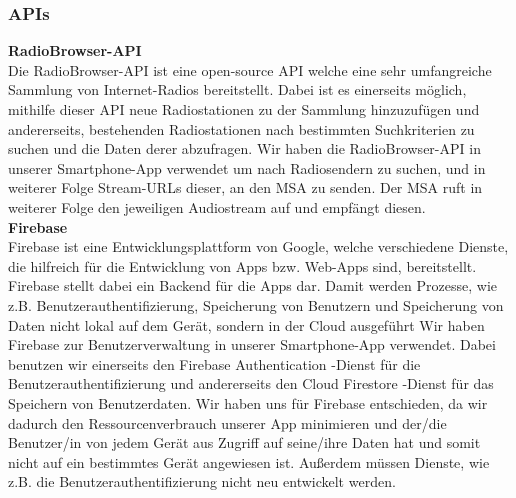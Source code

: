 \documentclass[11pt, twoside]{article}
\begin{document}
\subsubsection{APIs}
\textbf{RadioBrowser-API}\\
Die RadioBrowser-API ist eine open-source API welche eine sehr umfangreiche Sammlung von Internet-Radios bereitstellt. Dabei ist es einerseits möglich, mithilfe dieser API neue Radiostationen zu der Sammlung hinzuzufügen und andererseits, bestehenden Radiostationen nach bestimmten Suchkriterien zu suchen und die Daten derer abzufragen. \parencite[vgl.][]{noauthor_urlpi21_nodate} Wir haben die RadioBrowser-API in unserer Smartphone-App verwendet um nach Radiosendern zu suchen, und in weiterer Folge Stream-URLs dieser, an den MSA zu senden. Der MSA ruft in weiterer Folge den jeweiligen Audiostream auf und empfängt diesen. \newline \\
\textbf{Firebase}\\
Firebase ist eine Entwicklungsplattform von Google, welche verschiedene Dienste, die hilfreich für die Entwicklung von Apps bzw. Web-Apps sind, bereitstellt. Firebase stellt dabei ein Backend für die Apps dar. Damit werden Prozesse, wie z.B. Benutzerauthentifizierung, Speicherung von Benutzern und Speicherung von Daten nicht lokal auf dem Gerät, sondern in der Cloud ausgeführt \parencite[vgl.][]{noauthor_urlpi22_nodate} Wir haben Firebase zur Benutzerverwaltung in unserer Smartphone-App verwendet. Dabei benutzen wir einerseits den \glqq Firebase Authentication \grqq{} -Dienst für die Benutzerauthentifizierung und andererseits den \glqq Cloud Firestore \grqq{} -Dienst für das Speichern von Benutzerdaten. Wir haben uns für Firebase entschieden, da wir dadurch den Ressourcenverbrauch unserer App minimieren und der/die Benutzer/in von jedem Gerät aus Zugriff auf seine/ihre Daten hat und somit nicht auf ein bestimmtes Gerät angewiesen ist. Außerdem müssen Dienste, wie z.B. die Benutzerauthentifizierung nicht neu entwickelt werden.
\end{document}
